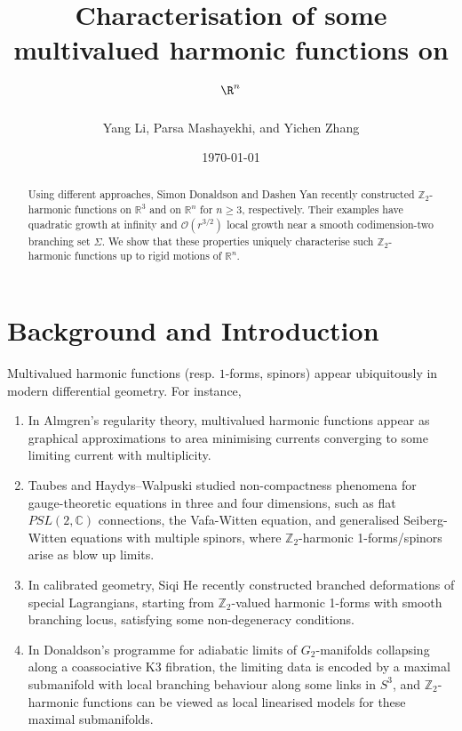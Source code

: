 \documentclass[11pt,a4paper]{article}
\title{Characterisation of some multivalued harmonic functions on $\R^{n}$}
\author{Yang Li, Parsa Mashayekhi, and Yichen Zhang}
\date{\today}
\numberwithin{equation}{section}%
\theoremstyle{definition}
\newcommand{\C}{\mathbb{C}}
\newcommand{\Z}{\mathbb{Z}}
\begin{document}
\maketitle
\begin{abstract}
Using different approaches, Simon Donaldson and Dashen Yan recently constructed $\mathbb Z_2$-harmonic functions on $\mathbb R^3$ and on $\mathbb R^n$ for $n\geqslant 3$, respectively. Their examples have quadratic growth at infinity and $\mathcal{O}(r^{3/2})$ local growth near a smooth codimension-two branching set $\Sigma$. We show that these properties uniquely characterise such $\mathbb Z_2$-harmonic functions up to rigid motions of $\mathbb R^n$.
\end{abstract}

\section{Background and Introduction}
    Multivalued harmonic functions (resp. $1$-forms, spinors) appear ubiquitously in modern differential geometry. For instance,

\begin{enumerate}
\item In Almgren's regularity theory, multivalued harmonic functions appear as graphical approximations to area minimising currents converging to some limiting current with multiplicity.


    \item  Taubes \cite{Taubes-PSL2C,Taubes-ZeroLoci} and Haydys--Walpuski \cite{haydys2015compactness} studied  non-compactness phenomena for gauge-theoretic equations in three and four dimensions, such as flat $PSL(2,\C)$ connections, the Vafa-Witten equation, and generalised Seiberg-Witten equations with multiple spinors, where $\Z_2$-harmonic 1-forms/spinors arise as blow up limits.


    \item  In calibrated geometry, Siqi He \cite{He-BranchedSLag} recently constructed branched deformations of special Lagrangians, starting from $\Z_2$-valued harmonic 1-forms with smooth branching locus, satisfying some non-degeneracy conditions.


    \item  In Donaldson's programme \cite{Donaldson-Adiabatic} for adiabatic limits of $G_2$-manifolds collapsing along a coassociative K3 fibration, the limiting data is encoded by a maximal submanifold with local branching behaviour along some links in $S^3$, and $\Z_2$-harmonic functions can be viewed as local linearised models for these maximal submanifolds.
\end{enumerate}
\end{document}
